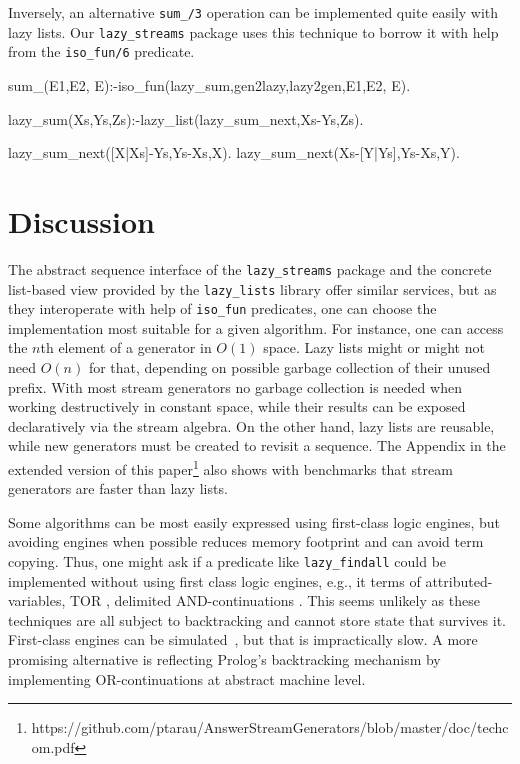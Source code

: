 \documentclass[submission,copyright,creativecommons]{eptcs}
\begin{document}
Inversely, an alternative {\tt sum\_/3} operation  can be implemented 
quite easily with lazy lists. Our {\tt lazy\_streams} package 
uses this technique to borrow it with help from the {\tt iso\_fun/6} predicate.
\begin{code}
sum_(E1,E2, E):-iso_fun(lazy_sum,gen2lazy,lazy2gen,E1,E2, E).

lazy_sum(Xs,Ys,Zs):-lazy_list(lazy_sum_next,Xs-Ys,Zs).
  
lazy_sum_next([X|Xs]-Ys,Ys-Xs,X).
lazy_sum_next(Xs-[Y|Ys],Ys-Xs,Y).
\end{code}

\section{Discussion}\label{disc}

The abstract sequence interface of the {\tt lazy\_streams} package and
the concrete list-based view provided by the {\tt lazy\_lists} library offer
similar services, but as they interoperate with help of {\tt iso\_fun} predicates,
one can choose the  implementation most suitable for a given algorithm.
For instance, one can access the $n$th element of a generator in $O(1)$ space.
Lazy lists might or might not need $O(n)$ for that, depending on possible garbage collection of their unused prefix.
With most stream generators no garbage collection is needed when working destructively in constant space, while their results can be exposed declaratively via the stream algebra.
On the other hand, lazy lists are reusable, while new generators 
must be created to revisit a sequence.
The Appendix in the extended version of this paper\footnote{
https://github.com/ptarau/AnswerStreamGenerators/blob/master/doc/techcom.pdf
}
also shows with benchmarks that stream generators are faster than lazy lists.

Some algorithms can be most easily expressed using first-class logic engines, but
avoiding engines when possible reduces memory footprint and can avoid term copying.
Thus, one might ask if a predicate like {\tt lazy\_findall} could be implemented
without using first class logic engines, e.g., it terms of  
attributed-variables, 
TOR \cite{tor}, delimited AND-continuations \cite{delim}.
This seems unlikely as  these techniques are all subject to backtracking and cannot
store state that survives it. First-class engines can be simulated~\cite{padl09inter}, but that is 
impractically slow. A more promising alternative is reflecting Prolog's backtracking mechanism by implementing OR-continuations at abstract machine level.
\end{document}
